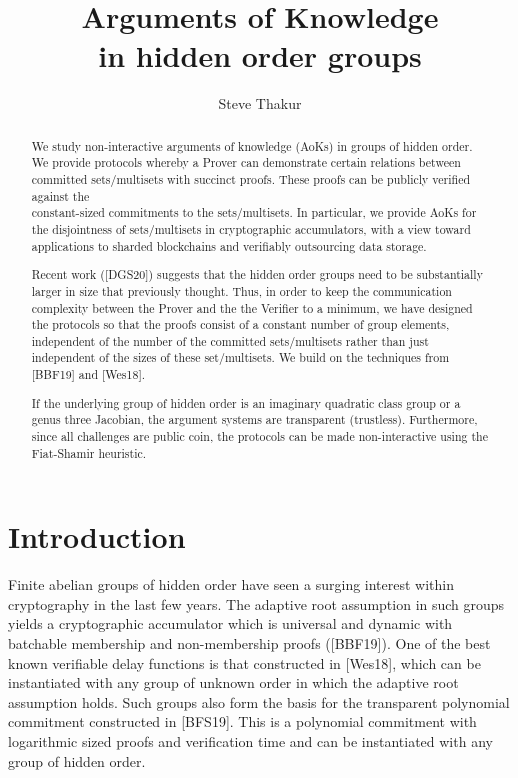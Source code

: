\documentclass[11pt, lettersize, notitlepage, leqno, footskip=0.6cm]{article}
\numberwithin{equation}{section}
\begin{document}
 
\title{Arguments of Knowledge\\ in hidden order groups}
\author{Steve Thakur}
\affil{}
\date{\vspace{-6ex}}
 
\maketitle

\begin{abstract} We study non-interactive arguments of knowledge (AoKs) in groups of hidden order. We provide protocols whereby a Prover can demonstrate certain relations between committed sets/multisets with succinct proofs. These proofs can be publicly verified against the\\ constant-sized commitments to the sets/multisets. In particular, we provide AoKs for the disjointness of sets/multisets in cryptographic accumulators, with a view toward applications to sharded blockchains and verifiably outsourcing data storage. 

Recent work ([DGS20]) suggests that the hidden order groups need to be substantially larger in size that previously thought. Thus, in order to keep the communication complexity between the Prover and the the Verifier to a minimum, we have designed the protocols so that the proofs consist of a constant number of group elements, independent of the number of the committed sets/multisets rather than just independent of the sizes of these set/multisets. We build on the techniques from [BBF19] and [Wes18].

If the underlying group of hidden order is an imaginary quadratic class group or a genus three Jacobian, the argument systems are transparent (trustless). Furthermore, since all challenges are public coin, the protocols can be made non-interactive using the Fiat-Shamir heuristic.\end{abstract}

\section{\fontsize{12}{12}\selectfont Introduction  }


Finite abelian groups of hidden order have seen a surging interest within cryptography in the last few years. The adaptive root assumption in such groups yields a cryptographic accumulator which is universal and dynamic with batchable membership and non-membership proofs ([BBF19]). One of the best known verifiable delay functions is that constructed in [Wes18], which can be instantiated with any group of unknown order in which the adaptive root assumption holds. Such groups also form the basis for the transparent polynomial commitment constructed in [BFS19]. This is a polynomial commitment with logarithmic sized proofs and verification time and can be instantiated with any group of hidden order.
\end{document}
